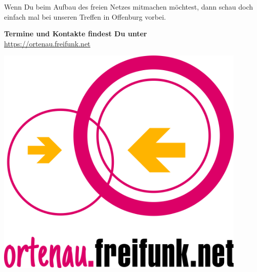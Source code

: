 \documentclass[a4paper]{article}
\begin{document}
\vspace{1.3cm}
\begin{Row}
    \begin{Cell}{1}
	Wenn Du beim Aufbau des freien Netzes mitmachen möchtest, dann schau doch einfach mal bei unseren Treffen in Offenburg vorbei.
	\end{Cell}
\end{Row}
\vspace{0.5cm}
\begin{center}
	\textbf{Termine und Kontakte findest Du unter} \\
	\url{https://ortenau.freifunk.net}
\end{center}
\begin{center}
\vspace{1cm}
\hspace*{-0.05 \paperwidth}\includegraphics[width=12cm]{../../logos/freifunk_ortenau_logo_1000}
\end{center}
\end{document}
